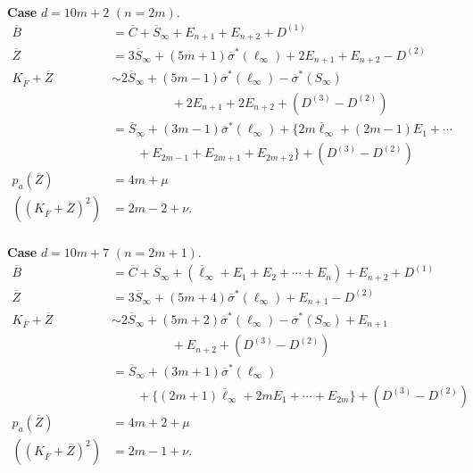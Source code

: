 \paragraph{}\label{chap3:3.5.2.1}
{\bf Case} $d=10m+2$ $(n=2m)$.
\begin{align*}
\overline{B} &=
\overline{C}+\overline{S}_{\infty}+E_{n+1}+E_{n+2}+D^{(1)}\\
\overline{Z} &=
3\overline{S}_{\infty}+(5m+1)\overline{\sigma}^{\ast}(\ell_{\infty})+2E_{n+1}+E_{n+2}-D^{(2)}\\
K_{\overline{F}}+\overline{Z} &\sim
2\overline{S}_{\infty}+(5m-1)\overline{\sigma}^{\ast}(\ell_{\infty})-\overline{\sigma}^{\ast}(S_{\infty})\\
& \hspace{2cm}+2E_{n+1}+2E_{n+2}+(D^{(3)}-D^{(2)})\\
&=
\overline{S}_{\infty}+(3m-1) \overline{\sigma}^{\ast} (\ell_{\infty})
+ \{2m\overline{\ell}_{\infty}+(2m-1)E_{1}+\cdots\\
& \qquad +E_{2m-1}+
E_{2m+1}+E_{2m+2}\}+(D^{(3)}-D^{(2)})\\
p_{a}(\overline{Z}) &= 4m+\mu\\
((K_{\overline{F}}+\overline{Z})^{2}) &= 2m-2+\nu.
\end{align*}

\paragraph{}\label{chap3:3.5.2.2}
{\bf Case} $d=10m+7$ $(n=2m+1)$.
\begin{align*}
\overline{B} &=
\overline{C}+\overline{S}_{\infty}+(\overline{\ell}_{\infty}+E_{1}+E_{2}+\cdots+E_{n})+E_{n+2}+D^{(1)}\\
\overline{Z} &=
3\overline{S}_{\infty}+(5m+4)\overline{\sigma}^{\ast}(\ell_{\infty})+E_{n+1}-D^{(2)}\\
K_{\overline{F}}+\overline{Z} &\sim
2\overline{S}_{\infty}+(5m+2) \overline{\sigma}^{\ast} (\ell_{\infty})
-\overline{\sigma}^{\ast}(S_{\infty})+E_{n+1}\\
& \hspace{2cm}+E_{n+2}+(D^{(3)}-D^{(2)})\\
&=\overline{S}_{\infty}+(3m+1) \overline{\sigma}^{\ast}
(\ell_{\infty})\\ 
& \qquad + \{(2m+1)\overline{\ell}_{\infty} + 2mE_{1}+\cdots+E_{2m}\}+(D^{(3)}-D^{(2)})\\
p_{a}(\overline{Z}) &= 4m+2+\mu\\
((K_{\overline{F}}+\overline{Z})^{2}) &= 2m-1+\nu.
\end{align*}

